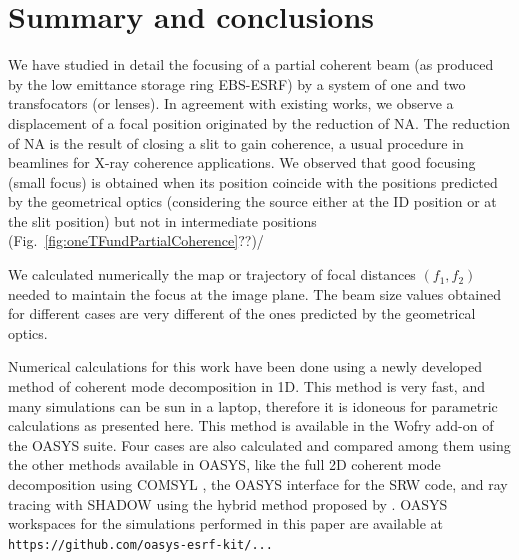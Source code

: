 \documentclass{iucr}              %
\begin{document}
\section{Summary and conclusions}
\label{sec:summary}

We have studied in detail the focusing of a partial coherent beam (as produced by the low emittance storage ring EBS-ESRF) by a system of one and two transfocators (or lenses). In agreement with existing works, we observe a displacement of a focal position originated by the reduction of NA. The reduction of NA is the result of closing a slit to gain coherence, a usual procedure in beamlines for X-ray coherence applications. We observed that good focusing (small focus) is obtained when its position coincide with the positions predicted by the geometrical optics (considering the source either at the ID position or at the slit position) but not in intermediate positions (Fig.~\ref{fig:oneTFundPartialCoherence}??)/

We calculated numerically the map or trajectory of focal distances $(f_1,f_2)$ needed to maintain the focus at the image plane. The beam size values obtained for different cases are very different of the ones predicted by the geometrical optics.  

Numerical calculations for this work have been done using a newly developed method of coherent mode decomposition in 1D. This method is very fast, and many simulations can be sun in a laptop, therefore it is idoneous for parametric calculations as presented here. This method is available in the Wofry add-on of the OASYS\cite{codeOASYS} suite. Four cases are also calculated and compared among them using the other methods available in OASYS, like the full 2D coherent mode decomposition using COMSYL \cite{codeCOMSYL}, the OASYS interface for the SRW \cite{codeSRW} code, and ray tracing with SHADOW\cite{codeSHADOW} using the hybrid method proposed by \cite{codeHYBRID}. OASYS workspaces for the simulations performed in this paper are available at {\tt https://github.com/oasys-esrf-kit/...} 

\appendix

\end{document}
